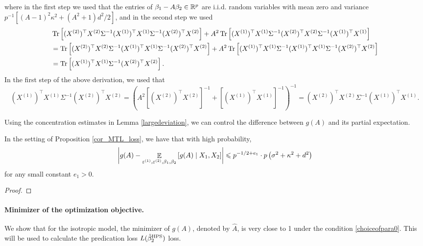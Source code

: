 where in the first step we used that the entries of $\beta_1-A\beta_2\in \mathbb{R}^p$ are i.i.d. random variables with mean zero and variance $p^{-1}[(A-1)^2\kappa^2 + (A^2+1)d^2/2]$, and in the second step we used  %
\begin{align*}
 &\operatorname{Tr}\left[  (X^{(2)})^\top X^{(2)} \Sigma^{-1}(X^{(1)})^\top X^{(1)} \Sigma^{-1} (X^{(2)})^\top X^{(2)}\right]+ A^2 \operatorname{Tr}\left[  (X^{(1)})^\top X^{(1)} \Sigma^{-1}(X^{(2)})^\top X^{(2)} \Sigma^{-1} (X^{(1)})^\top X^{(1)}\right] \\
 &=\operatorname{Tr}\left[  (X^{(2)})^\top X^{(2)} \Sigma^{-1}(X^{(1)})^\top X^{(1)} \Sigma^{-1} (X^{(2)})^\top X^{(2)}\right]+ A^2 \operatorname{Tr}\left[  (X^{(1)})^\top X^{(1)} \Sigma^{-1}(X^{(1)})^\top X^{(1)} \Sigma^{-1}(X^{(2)})^\top X^{(2)} \right] \\
 & = \operatorname{Tr}\left[ (X^{(1)})^\top X^{(1)} \Sigma^{-1}(X^{(2)})^\top X^{(2)}\right] .
\end{align*}
 In the first step of the above derivation, we used that 
 $$(X^{(1)})^\top X^{(1)} \Sigma^{-1}(X^{(2)})^\top X^{(2)} =\left( A^2 [(X^{(2)})^\top X^{(2)}]^{-1} + [(X^{(1)})^\top X^{(1)}]^{-1} \right)^{-1} = (X^{(2)})^\top X^{(2)} \Sigma^{-1}(X^{(1)})^\top X^{(1)}.$$
 
Using the concentration estimates in Lemma \ref{largedeviation}, we can control the difference between $g(A)$ and its partial expectation. %
 \begin{claim}\label{claim_largedev1}
 In the setting of Proposition \ref{cor_MTL_loss}, we have that with high probability,
$$\left| g(A) - \mathop{\mathbb{E}}_{\varepsilon^{(1)}, \varepsilon^{(2)} ,\beta_1,\beta_2}\left[ g(A) \mid X_1, X_2  \right]\right| \leqslant p^{-1/2+e_1}\cdot p\left(\sigma^2 + \kappa^2+d^2 \right) $$
for any small constant $e_1>0$.
 \end{claim}
 \begin{proof}
 \end{proof}


 \paragraph{Minimizer of the optimization objective.} We show that for the isotropic model, the minimizer of $g(A)$, denoted by $\hat A$, is very close to 1 under the condition \eqref{choiceofpara0}. This will be used to calculate the predication loss $L(\hat{\beta}_2^{\textup{HPS}})$ loss.

